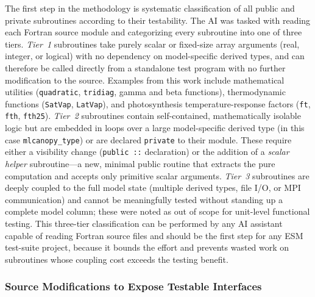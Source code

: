 The first step in the methodology is systematic classification of all public and
private subroutines according to their testability.  The AI was tasked with reading
each Fortran source module and categorizing every subroutine into one of three
tiers.  \emph{Tier~1} subroutines take purely scalar or fixed-size array arguments
(real, integer, or logical) with no dependency on model-specific derived types, and
can therefore be called directly from a standalone test program with no further
modification to the source.  Examples from this work include mathematical utilities
(\texttt{quadratic}, \texttt{tridiag}, gamma and beta functions), thermodynamic
functions (\texttt{SatVap}, \texttt{LatVap}), and photosynthesis temperature-response
factors (\texttt{ft}, \texttt{fth}, \texttt{fth25}).  \emph{Tier~2} subroutines
contain self-contained, mathematically isolable logic but are embedded in loops over
a large model-specific derived type (in this case \texttt{mlcanopy\_type}) or are
declared \texttt{private} to their module.  These require either a visibility change
(\texttt{public ::} declaration) or the addition of a \emph{scalar helper}
subroutine—a new, minimal public routine that extracts the pure computation and
accepts only primitive scalar arguments.  \emph{Tier~3} subroutines are deeply
coupled to the full model state (multiple derived types, file I/O, or MPI
communication) and cannot be meaningfully tested without standing up a complete model
column; these were noted as out of scope for unit-level functional testing.  This
three-tier classification can be performed by any AI assistant capable of reading
Fortran source files and should be the first step for any ESM test-suite project,
because it bounds the effort and prevents wasted work on subroutines whose coupling
cost exceeds the testing benefit.

\subsubsection{Source Modifications to Expose Testable Interfaces}

